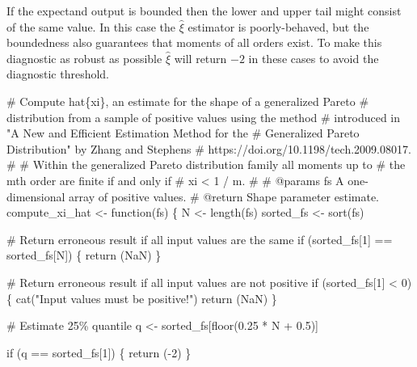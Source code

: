 \documentclass[
  letterpaper,
  DIV=11,
  numbers=noendperiod]{scrartcl}
\newenvironment{Shaded}{\begin{snugshade}}{\end{snugshade}}
\newcommand{\CommentTok}[1]{\textcolor[rgb]{0.37,0.37,0.37}{#1}}
\newcommand{\ControlFlowTok}[1]{\textcolor[rgb]{0.00,0.23,0.31}{#1}}
\newcommand{\DecValTok}[1]{\textcolor[rgb]{0.68,0.00,0.00}{#1}}
\newcommand{\FloatTok}[1]{\textcolor[rgb]{0.68,0.00,0.00}{#1}}
\newcommand{\NormalTok}[1]{\textcolor[rgb]{0.00,0.23,0.31}{#1}}
\newcommand{\OperatorTok}[1]{\textcolor[rgb]{0.37,0.37,0.37}{#1}}
\newcommand{\StringTok}[1]{\textcolor[rgb]{0.13,0.47,0.30}{#1}}
\begin{document}
If the expectand output is bounded then the lower and upper tail might
consist of the same value. In this case the \(\hat{\xi}\) estimator is
poorly-behaved, but the boundedness also guarantees that moments of all
orders exist. To make this diagnostic as robust as possible
\(\hat{\xi}\) will return \(-2\) in these cases to avoid the diagnostic
threshold.

\begin{Shaded}
\begin{Highlighting}[]
\CommentTok{\# Compute hat\{xi\}, an estimate for the shape of a generalized Pareto }
\CommentTok{\# distribution from a sample of positive values using the method }
\CommentTok{\# introduced in "A New and Efficient Estimation Method for the }
\CommentTok{\# Generalized Pareto Distribution" by Zhang and Stephens }
\CommentTok{\# https://doi.org/10.1198/tech.2009.08017.}
\CommentTok{\# }
\CommentTok{\# Within the generalized Pareto distribution family all moments up to }
\CommentTok{\# the mth order are finite if and only if }
\CommentTok{\#  xi \textless{} 1 / m.}
\CommentTok{\#}
\CommentTok{\# @params fs A one{-}dimensional array of positive values.}
\CommentTok{\# @return Shape parameter estimate.}
\NormalTok{compute\_xi\_hat }\OperatorTok{\textless{}{-}}\NormalTok{ function(fs) \{}
\NormalTok{  N }\OperatorTok{\textless{}{-}}\NormalTok{ length(fs)}
\NormalTok{  sorted\_fs }\OperatorTok{\textless{}{-}}\NormalTok{ sort(fs)}

  \CommentTok{\# Return erroneous result if all input values are the same }
  \ControlFlowTok{if}\NormalTok{ (sorted\_fs[}\DecValTok{1}\NormalTok{] }\OperatorTok{==}\NormalTok{ sorted\_fs[N]) \{}
    \ControlFlowTok{return}\NormalTok{ (NaN)}
\NormalTok{  \}}

  \CommentTok{\# Return erroneous result if all input values are not positive}
  \ControlFlowTok{if}\NormalTok{ (sorted\_fs[}\DecValTok{1}\NormalTok{] }\OperatorTok{\textless{}} \DecValTok{0}\NormalTok{) \{}
\NormalTok{    cat(}\StringTok{"Input values must be positive!"}\NormalTok{)}
    \ControlFlowTok{return}\NormalTok{ (NaN)}
\NormalTok{  \}}

  \CommentTok{\# Estimate 25\% quantile}
\NormalTok{  q }\OperatorTok{\textless{}{-}}\NormalTok{ sorted\_fs[floor(}\FloatTok{0.25} \OperatorTok{*}\NormalTok{ N }\OperatorTok{+} \FloatTok{0.5}\NormalTok{)]}

  \ControlFlowTok{if}\NormalTok{ (q }\OperatorTok{==}\NormalTok{ sorted\_fs[}\DecValTok{1}\NormalTok{]) \{}
    \ControlFlowTok{return}\NormalTok{ (}\OperatorTok{{-}}\DecValTok{2}\NormalTok{)}
\NormalTok{  \}}


\end{Highlighting}
\end{Shaded}
\end{document}
